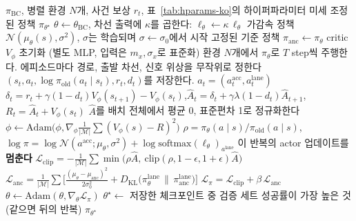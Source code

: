 \documentclass[10pt]{article}
\newcommand{\KL}{D_{\mathrm{KL}}}
\begin{document}
\begin{algorithm}[t]
\caption{BC 정책에서 시작하는 Anchored PPO 미세 조정}
\label{alg:ppo-ko}
\begin{algorithmic}[1]
\Require $\pi_{\mathrm{BC}}$, 병렬 환경 $N$개, 사건 보상 $r_t$, 표~\ref{tab:hparams-ko}의 하이퍼파라미터
\Ensure 미세 조정된 정책 $\pi_{\theta^\star}$
\State $\theta \gets \theta_{\mathrm{BC}}$, 차선 출력에 $\kappa$를 곱한다: $\ell_\theta \gets \kappa\,\ell_\theta$ 
\State 가감속 정책 $\mathcal{N}(\mu_\theta(s), \sigma^2)$, $\sigma$는 학습되며 $\sigma \gets \sigma_0$에서 시작
\State 고정된 기준 정책 $\pi_{\mathrm{anc}} \gets \pi_\theta$ 
\State critic $V_\phi$ 초기화 (별도 MLP, 입력은 $m_x,\sigma_x$로 표준화)
  \State 환경 $N$개에서 $\pi_\theta$로 $T$ step씩 주행한다. 에피소드마다 경로, 출발 차선, 신호 위상을 무작위로 정한다
  \State $(s_t, a_t, \log\pi_{\mathrm{old}}(a_t\mid s_t), r_t, d_t)$를 저장한다. $a_t = (a^{\mathrm{acc}}_t, a^{\mathrm{lane}}_t)$
  \State $\delta_t = r_t + \gamma(1-d_t)V_\phi(s_{t+1}) - V_\phi(s_t)$,\quad $\hat A_t = \delta_t + \gamma\lambda(1-d_t)\hat A_{t+1}$,\quad $R_t = \hat A_t + V_\phi(s_t)$
  \State $\hat A$를 배치 전체에서 평균 0, 표준편차 1로 정규화한다
   
     \State $\phi \gets \mathrm{Adam}\big(\phi, \nabla_\phi \tfrac{1}{|\mathcal{M}|}\sum (V_\phi(s)-R)^2\big)$ \EndFor
  \EndFor
   
        \State $\rho = \pi_\theta(a\mid s)/\pi_{\mathrm{old}}(a\mid s)$, $\log\pi = \log\mathcal{N}(a^{\mathrm{acc}};\mu_\theta,\sigma^2) + \log\mathrm{softmax}(\ell_\theta)_{a^{\mathrm{lane}}}$
         이 반복의 actor 업데이트를 \textbf{멈춘다} \EndIf
        \State $\displaystyle \mathcal{L}_{\mathrm{clip}} = -\frac{1}{|\mathcal{M}|}\sum \min\!\big(\rho\hat A,\ \mathrm{clip}(\rho,1-\epsilon,1+\epsilon)\hat A\big)$
        \State $\displaystyle \mathcal{L}_{\mathrm{anc}} = \frac{1}{|\mathcal{M}|}\sum\Big[\frac{(\mu_\theta-\mu_{\mathrm{anc}})^2}{2\sigma_0^2} + \KL\big(\pi^{\mathrm{lane}}_\theta\,\|\,\pi^{\mathrm{lane}}_{\mathrm{anc}}\big)\Big]$
        \State $\mathcal{L}_\pi = \mathcal{L}_{\mathrm{clip}} + \beta\,\mathcal{L}_{\mathrm{anc}}$ 
        \State $\theta \gets \mathrm{Adam}(\theta, \nabla_\theta \mathcal{L}_\pi)$ 
      \EndFor
    \EndFor
  \EndIf
\EndFor
\State $\theta^\star \gets$ 저장한 체크포인트 중 검증 세트 성공률이 가장 높은 것 (같으면 뒤의 반복)
\State \Return $\pi_{\theta^\star}$ 
\end{algorithmic}
\end{algorithm}
\end{document}
